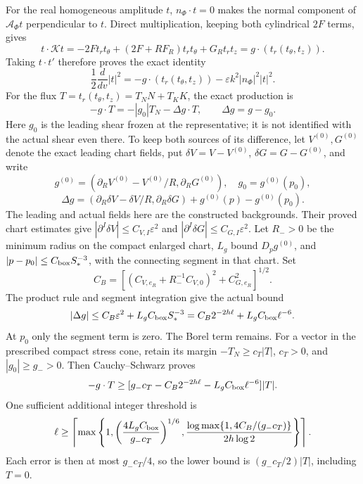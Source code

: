 \documentclass[10pt,a4paper]{article}
\begin{document}
For the real homogeneous amplitude \(t\), \(n_\Phi\cdot t=0\) makes the normal component of \(\mathcal A_\Phi t\) perpendicular to \(t\). Direct multiplication, keeping both cylindrical \(2F\) terms, gives \[
t\cdot\mathcal Kt
=-2Ft_rt_\theta+(2F+RF_R)t_rt_\theta+G_Rt_rt_z
=g\cdot(t_r(t_\theta,t_z)).
\] Taking \(t\cdot t'\) therefore proves the exact identity \[
\frac12\frac{d}{dv}|t|^2
=-g\cdot(t_r(t_\theta,t_z))-\varepsilon k^2|n_\Phi|^2|t|^2.
\] For the flux \(T=t_r(t_\theta,t_z)=T_NN+T_KK\), the exact
production is
\[
-g\cdot T=-|g_0|T_N-\Delta g\cdot T,\qquad \Delta g=g-g_0.
\]
Here \(g_0\) is the leading shear frozen at the representative;
it is not identified with the actual shear even there. To keep both
sources of its difference, let \(V^{(0)},G^{(0)}\) denote the exact
leading chart fields, put \(\delta V=V-V^{(0)}\),
\(\delta G=G-G^{(0)}\), and write
\[
g^{(0)}=(\partial_RV^{(0)}-V^{(0)}/R,\partial_RG^{(0)}),
\quad g_0=g^{(0)}(p_0),
\]
\[
\Delta g=(\partial_R\delta V-\delta V/R,\partial_R\delta G)
+g^{(0)}(p)-g^{(0)}(p_0).
\]
The leading and actual fields here are the constructed backgrounds.
Their proved chart estimates give
\(|\partial^I\delta V|\le C_{V,I}\varepsilon^2\) and
\(|\partial^I\delta G|\le C_{G,I}\varepsilon^2\).
Let \(R_->0\) be the minimum radius on the compact enlarged chart,
\(L_g\) bound \(D_pg^{(0)}\), and
\(|p-p_0|\le C_{\rm box}S_*^{-3}\), with the connecting segment
in that chart. Set
\[
C_B=\left[(C_{V,e_R}+R_-^{-1}C_{V,0})^2+C_{G,e_R}^2\right]^{1/2}.
\]
The product rule and segment integration give the actual bound
\[
|\Delta g|\le C_B\varepsilon^2+L_gC_{\rm box}S_*^{-3}
=C_B2^{-2h\ell}+L_gC_{\rm box}\ell^{-6}.
\]
At \(p_0\) only the segment term is zero. The Borel term remains.
For a vector in the prescribed compact stress cone, retain its margin
\(-T_N\ge c_T|T|\), \(c_T>0\), and \(|g_0|\ge g_->0\).
Then Cauchy--Schwarz proves
\[
-g\cdot T\ge
[g_-c_T-C_B2^{-2h\ell}-L_gC_{\rm box}\ell^{-6}]|T|.
\]
One sufficient additional integer threshold is
\[
\ell\ge\left\lceil\max\left\{
1,\left(\frac{4L_gC_{\rm box}}{g_-c_T}\right)^{1/6},
\frac{\log\max\{1,4C_B/(g_-c_T)\}}{2h\log2}
\right\}\right\rceil.
\]
Each error is then at most \(g_-c_T/4\), so the lower bound is
\((g_-c_T/2)|T|\), including \(T=0\).
\end{document}

